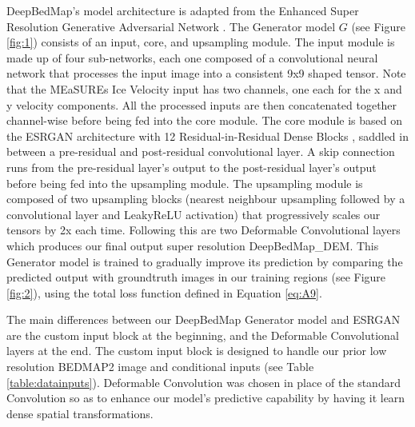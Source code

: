 \documentclass[tc, manuscript]{copernicus}
\begin{document}
DeepBedMap's model architecture is adapted from the Enhanced Super Resolution Generative Adversarial Network \citep[ESRGAN,][]{WangESRGANEnhancedSuperResolution2018}.
The Generator model $G$ (see Figure \ref{fig:1}) consists of an input, core, and upsampling module.
The input module is made up of four sub-networks, each one composed of a convolutional neural network that processes the input image into a consistent 9x9 shaped tensor.
Note that the MEaSUREs Ice Velocity input has two channels, one each for the x and y velocity components.
All the processed inputs are then concatenated together channel-wise before being fed into the core module.
The core module is based on the ESRGAN architecture with 12 Residual-in-Residual Dense Blocks \citep[see][for details]{WangESRGANEnhancedSuperResolution2018}, saddled in between a pre-residual and post-residual convolutional layer.
A skip connection runs from the pre-residual layer's output to the post-residual layer's output before being fed into the upsampling module.
The upsampling module is composed of two upsampling blocks (nearest neighbour upsampling followed by a convolutional layer and LeakyReLU activation) that progressively scales our tensors by 2x each time.
Following this are two Deformable Convolutional layers \citep{DaiDeformableConvolutionalNetworks2017} which produces our final output super resolution DeepBedMap\_DEM.
This Generator model is trained to gradually improve its prediction by comparing the predicted output with groundtruth images in our training regions (see Figure \ref{fig:2}), using the total loss function defined in Equation \eqref{eq:A9}.

The main differences between our DeepBedMap Generator model and ESRGAN are the custom input block at the beginning, and the Deformable Convolutional layers at the end.
The custom input block is designed to handle our prior low resolution BEDMAP2 image and conditional inputs (see Table \ref{table:datainputs}).
Deformable Convolution was chosen in place of the standard Convolution so as to enhance our model's predictive capability by having it learn dense spatial transformations.
\end{document}
